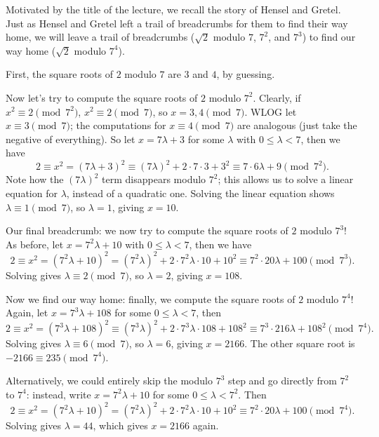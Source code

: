\documentclass[11pt]{scrartcl}
\begin{document}
\begin{solution}{}
	Motivated by the title of the lecture, we recall the story of Hensel and Gretel. Just as Hensel and Gretel left a trail of breadcrumbs for them to find their way home, we will leave a trail of breadcrumbs ($\sqrt 2$ modulo $7$, $7^2$, and $7^3$) to find our way home ($\sqrt 2$ modulo $7^4$).

	First, the square roots of $2$ modulo $7$ are $3$ and $4$, by guessing.

	Now let's try to compute the square roots of $2$ modulo $7^2$. Clearly, if $x^2 \equiv 2 \pmod{7^2}$, $x^2 \equiv 2 \pmod 7$, so $x = 3,4 \pmod 7$. WLOG let $x \equiv 3 \pmod 7$; the computations for $x \equiv 4 \pmod 7$ are analogous (just take the negative of everything). So let $x = 7\lambda + 3$ for some $\lambda$ with $0 \le \lambda < 7$, then we have
	\[2 \equiv x^2 = (7\lambda + 3)^2 \equiv (7\lambda)^2 + 2 \cdot 7 \cdot 3 + 3^2 \equiv 7 \cdot 6\lambda + 9\pmod{7^2}.\]
	Note how the $(7\lambda)^2$ term disappears modulo $7^2$; this allows us to solve a linear equation for $\lambda$, instead of a quadratic one. Solving the linear equation shows $\lambda \equiv 1 \pmod 7$, so $\lambda= 1$, giving $x = 10$.

	Our final breadcrumb: we now try to compute the square roots of $2$ modulo $7^3$! As before, let $x = 7^2\lambda + 10$ with $0 \le \lambda < 7$, then we have
	\[2 \equiv x^2 = (7^2\lambda + 10)^2 = (7^2\lambda)^2 + 2 \cdot 7^2\lambda \cdot 10 + 10^2 \equiv 7^2 \cdot 20\lambda + 100 \pmod{7^3}.\]
	Solving gives $\lambda \equiv 2 \pmod 7$, so $\lambda = 2$, giving $x = 108$.

	Now we find our way home: finally, we compute the square roots of $2$ modulo $7^4$! Again, let $x = 7^3\lambda + 108$ for some $0 \le \lambda < 7$, then
	\[2 \equiv x^2 = (7^3\lambda + 108)^2 \equiv (7^3\lambda)^2 + 2 \cdot 7^3\lambda \cdot 108 + 108^2 \equiv 7^3 \cdot 216\lambda + 108^2 \pmod{7^4}.\]
	Solving gives $\lambda \equiv 6 \pmod 7$, so $\lambda = 6$, giving $x = 2166$. The other square root is $-2166 \equiv 235 \pmod{7^4}$.

	Alternatively, we could entirely skip the modulo $7^3$ step and go directly from $7^2$ to $7^4$: instead, write $x = 7^2\lambda + 10$ for some $0 \le \lambda < 7^2$. Then
	\[2 \equiv x^2 = (7^2\lambda + 10)^2 = (7^2\lambda)^2 + 2 \cdot 7^2\lambda \cdot 10 + 10^2 \equiv 7^2 \cdot 20\lambda + 100 \pmod{7^4}.\]
	Solving gives $\lambda = 44$, which gives $x = 2166$ again.
\end{solution}
\end{document}
